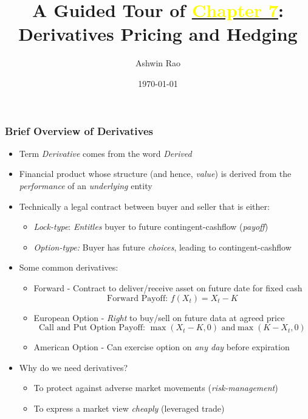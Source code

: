 \documentclass[handout]{beamer}
\title[Derivatives Chapter]{A Guided Tour of \href{http://stanford.edu/~ashlearn/RLForFinanceBook/book.pdf}{\underline{\textcolor{yellow}{Chapter 7}}}: \\  Derivatives Pricing and Hedging}
\author{Ashwin Rao} %
\institute[Stanford] %
{
ICME, Stanford University
}
\date{\today} %
\begin{document}
\begin{frame}
\titlepage %
\end{frame}



\begin{frame}
\frametitle{Brief Overview of Derivatives}
\begin{itemize}[<+->]
\item Term {\em Derivative} comes from the word {\em Derived}
\item Financial product whose structure (and hence, {\em value}) is derived from the {\em performance} of an {\em underlying} entity
\item Technically a legal contract between buyer and seller that is either:
\begin{itemize}[<+->]
\item {\em Lock-type}: {\em Entitles} buyer to future contingent-cashflow ({\em payoff})
\item {\em Option-type:} Buyer has future {\em choices}, leading to contingent-cashflow
\end{itemize}
\item Some common derivatives:
\begin{itemize}[<+->]
\item Forward  - Contract to deliver/receive asset on future date for fixed cash
$$\text{Forward Payoff: } f(X_t) = X_t - K$$
\item European Option - {\em Right} to buy/sell on future data at agreed price
$$\text{Call and Put Option Payoff: } \max(X_t - K, 0) \text{ and} \max(K - X_t, 0)$$
\item American Option - Can exercise option on {\em any day} before expiration
\end{itemize}
\item Why do we need derivatives?
\begin{itemize}[<+->]
\item To protect against adverse market movements ({\em risk-management})
\item To express a market view {\em cheaply} (leveraged trade)
\end{itemize}
\end{itemize}
\end{frame}
\end{document}
